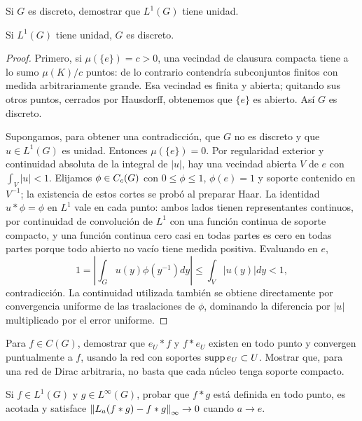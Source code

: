 \begin{ejercicio}\label{ej:v4-l22-2}
Si $G$ es discreto, demostrar que $L^1(G)$ tiene unidad.
\end{ejercicio}

\begin{proposicion}\label{v4:luno-unitaria}
Si $L^1(G)$ tiene unidad, $G$ es discreto.
\end{proposicion}
\begin{proof}
Primero, si $\mu(\{e\})=c>0$, una vecindad de clausura compacta tiene a lo sumo $\mu(K)/c$ puntos: de lo contrario contendría subconjuntos finitos con medida arbitrariamente grande. Esa vecindad es finita y abierta; quitando sus otros puntos, cerrados por Hausdorff, obtenemos que $\{e\}$ es abierto. Así $G$ es discreto.

Supongamos, para obtener una contradicción, que $G$ no es discreto y que $u\in L^1(G)$ es unidad. Entonces $\mu(\{e\})=0$. Por regularidad exterior y continuidad absoluta de la integral de $|u|$, hay una vecindad abierta $V$ de $e$ con $\int_V|u|<1$. Elijamos $\phi\in C_c(G)$ con $0\le\phi\le1$, $\phi(e)=1$ y soporte contenido en $V^{-1}$; la existencia de estos cortes se probó al preparar Haar. La identidad $u*\phi=\phi$ en $L^1$ vale en cada punto: ambos lados tienen representantes continuos, por continuidad de convolución de $L^1$ con una función continua de soporte compacto, y una función continua cero casi en todas partes es cero en todas partes porque todo abierto no vacío tiene medida positiva. Evaluando en $e$,
\[
1=\left|\int_Gu(y)\phi(y^{-1})dy\right|\le\int_V|u(y)|dy<1,
\]
contradicción. La continuidad utilizada también se obtiene directamente por convergencia uniforme de las traslaciones de $\phi$, dominando la diferencia por $|u|$ multiplicado por el error uniforme.
\end{proof}
\begin{ejercicio}\label{ej:v4-l22-3}
Para $f\in C(G)$, demostrar que $e_U*f$ y $f*e_U$ existen en todo punto y convergen puntualmente a $f$, usando la red con soportes $\operatorname{supp} e_U\subset U$. Mostrar que, para una red de Dirac arbitraria, no basta que cada núcleo tenga soporte compacto.
\end{ejercicio}

\begin{ejercicio}\label{ej:v4-l22-4}
Si $f\in L^1(G)$ y $g\in L^\infty(G)$, probar que $f*g$ está definida en todo punto, es acotada y satisface $\left\lVert L_a(f*g)-f*g\right\rVert_\infty\to0$ cuando $a\to e$.
\end{ejercicio}

